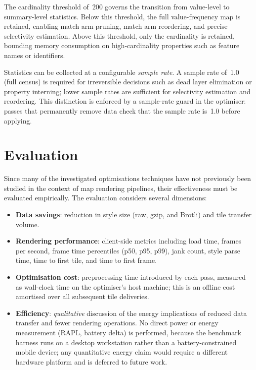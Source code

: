 \noindent The cardinality threshold of~200 governs the transition from value-level to summary-level statistics.
Below this threshold, the full value-frequency map is retained, enabling match arm pruning, match arm reordering, and precise selectivity estimation.
Above this threshold, only the cardinality is retained, bounding memory consumption on high-cardinality properties such as feature names or identifiers.

Statistics can be collected at a configurable \emph{sample rate}.
A sample rate of~1.0 (full census) is required for irreversible decisions such as dead layer elimination or property interning; lower sample rates are sufficient for selectivity estimation and reordering.
This distinction is enforced by a sample-rate guard in the optimiser: passes that permanently remove data check that the sample rate is~1.0 before applying.

\section{Evaluation}\label{sec_evaluation}

Since many of the investigated optimisations techniques have not previously been studied in the context of map rendering pipelines, their effectiveness must be evaluated empirically.
The evaluation considers several dimensions:

\begin{itemize}
    \item \textbf{Data savings}: reduction in style size (raw, gzip, and Brotli) and tile transfer volume.
    \item \textbf{Rendering performance}: client-side metrics including load time, frames per second, frame time percentiles (p50, p95, p99), jank count, style parse time, time to first tile, and time to first frame.
    \item \textbf{Optimisation cost}: preprocessing time introduced by each pass, measured as wall-clock time on the optimiser's host machine; this is an offline cost amortised over all subsequent tile deliveries.
    \item \textbf{Efficiency}: \emph{qualitative} discussion of the energy implications of reduced data transfer and fewer rendering operations.  No direct power or energy measurement (RAPL, battery delta) is performed, because the benchmark harness runs on a desktop workstation rather than a battery-constrained mobile device; any quantitative energy claim would require a different hardware platform and is deferred to future work.
\end{itemize}

